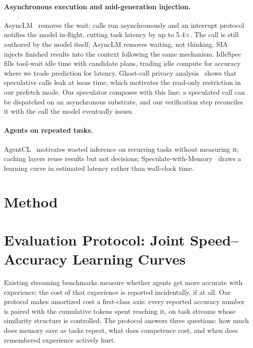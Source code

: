 \documentclass[11pt]{article}
\begin{document}
\paragraph{Asynchronous execution and mid-generation injection.}
AsyncLM~\citep{asynclm2024} removes the wait: calls run asynchronously and an
interrupt protocol notifies the model in-flight, cutting task latency by up
to 5.4$\times$. The call is still authored by the model itself; AsyncLM
removes waiting, not thinking. SIA~\citep{sia2026} injects finished results
into the context following the same mechanism. IdleSpec~\citep{idlespec2026}
fills tool-wait idle time with candidate plans, trading idle compute for
accuracy where we trade prediction for latency. Ghost-call privacy
analysis~\citep{ghost2026} shows that speculative calls leak at issue time,
which motivates the read-only restriction in our prefetch mode. Our
speculator composes with this line: a speculated call can be dispatched on an
asynchronous substrate, and our verification step reconciles it with the call
the model eventually issues.

\paragraph{Agents on repeated tasks.}
AgentCL~\citep{agentcl2026} motivates wasted inference on recurring tasks
without measuring it; caching layers reuse results but not decisions;
Speculate-with-Memory~\citep{swm2026} draws a learning curve in estimated
latency rather than wall-clock time.

\section{Method}

\section{Evaluation Protocol: Joint Speed--Accuracy Learning Curves}
\label{sec:protocol}

Existing streaming benchmarks measure whether agents get more accurate with
experience; the cost of that experience is reported incidentally, if at all.
Our protocol makes amortized cost a first-class axis: every reported accuracy
number is paired with the cumulative tokens spent reaching it, on task streams
whose similarity structure is controlled. The protocol answers three
questions: how much does memory save as tasks repeat, what does competence
cost, and when does remembered experience actively hurt.
\end{document}
